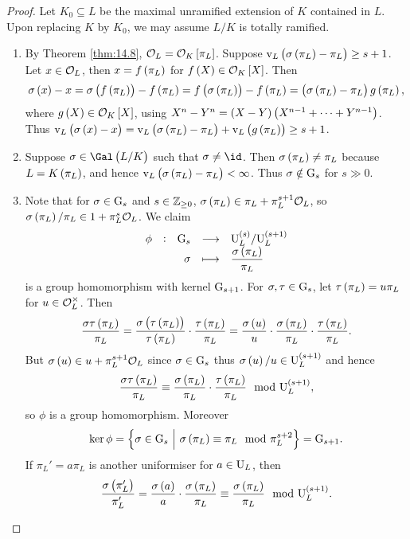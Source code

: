 \begin{proof}
Let $ K_0 \subseteq L $ be the maximal unramified extension of $ K $ contained in $ L $. Upon replacing $ K $ by $ K_0 $, we may assume $ L / K $ is totally ramified.
\begin{enumerate}
\item By Theorem \ref{thm:14.8}, $ \OOO_L = \OOO_K\sbr{\pi_L} $. Suppose $ \v_L\br{\sigma\br{\pi_L} - \pi_L} \ge s + 1 $. Let $ x \in \mathcal{O}_L $, then $ x = f\br{\pi_L} $ for $ f\br{X} \in \OOO_K\sbr{X} $. Then
$$ \sigma\br{x} - x = \sigma\br{f\br{\pi_L}} - f\br{\pi_L} = f\br{\sigma\br{\pi_L}} - f\br{\pi_L} = \br{\sigma\br{\pi_L} - \pi_L}g\br{\pi_L}, $$
where $ g\br{X} \in \OOO_K\sbr{X} $, using $ X^n - Y^n = \br{X - Y}\br{X^{n - 1} + \dots + Y^{n - 1}} $. Thus $ \v_L\br{\sigma\br{x} - x} = \v_L\br{\sigma\br{\pi_L} - \pi_L} + \v_L\br{g\br{\pi_L}} \ge s + 1 $.

\pagebreak

\item Suppose $ \sigma \in \Gal\br{L / K} $ such that $ \sigma \ne \id $. Then $ \sigma\br{\pi_L} \ne \pi_L $ because $ L = K\br{\pi_L} $, and hence $ \v_L\br{\sigma\br{\pi_L} - \pi_L} < \infty $. Thus $ \sigma \notin \mathrm{G}_s $ for $ s \gg 0 $.
\item Note that for $ \sigma \in \mathrm{G}_s $ and $ s \in \mathbb{Z}_{\ge 0} $, $ \sigma\br{\pi_L} \in \pi_L + \pi_L^{s + 1}\OOO_L $, so $ \sigma\br{\pi_L} / \pi_L \in 1 + \pi_L^s\OOO_L $. We claim
$$ \function[\phi]{\G_s}{\U_L^{\br{s}} / \U_L^{\br{s + 1}}}{\sigma}{\dfrac{\sigma\br{\pi_L}}{\pi_L}} $$
is a group homomorphism with kernel $ \mathrm{G}_{s + 1} $. For $ \sigma, \tau \in \mathrm{G}_s $, let $ \tau\br{\pi_L} = u\pi_L $ for $ u \in \mathcal{O}_L^\times $. Then
$$ \dfrac{\sigma\tau\br{\pi_L}}{\pi_L} = \dfrac{\sigma\br{\tau\br{\pi_L}}}{\tau\br{\pi_L}} \cdot \dfrac{\tau\br{\pi_L}}{\pi_L} = \dfrac{\sigma\br{u}}{u} \cdot \dfrac{\sigma\br{\pi_L}}{\pi_L} \cdot \dfrac{\tau\br{\pi_L}}{\pi_L}. $$
But $ \sigma\br{u} \in u + \pi_L^{s + 1}\OOO_L $ since $ \sigma \in \mathrm{G}_s $ thus $ \sigma\br{u} / u \in \U_L^{\br{s + 1}} $ and hence
$$ \dfrac{\sigma\tau\br{\pi_L}}{\pi_L} \equiv \dfrac{\sigma\br{\pi_L}}{\pi_L} \cdot \dfrac{\tau\br{\pi_L}}{\pi_L} \mod \U_L^{\br{s + 1}}, $$
so $ \phi $ is a group homomorphism. Moreover
$$ \ker \phi = \cbr{\sigma \in \G_s \st \sigma\br{\pi_L} \equiv \pi_L \mod \pi_L^{s + 2}} = \G_{s + 1}. $$
If $ \pi_L' = a\pi_L $ is another uniformiser for $ a \in \mathrm{U}_L $, then
$$ \dfrac{\sigma\br{\pi_L'}}{\pi_L'} = \dfrac{\sigma\br{a}}{a} \cdot \dfrac{\sigma\br{\pi_L}}{\pi_L} \equiv \dfrac{\sigma\br{\pi_L}}{\pi_L} \mod \U_L^{\br{s + 1}}. $$
\end{enumerate}
\end{proof}

